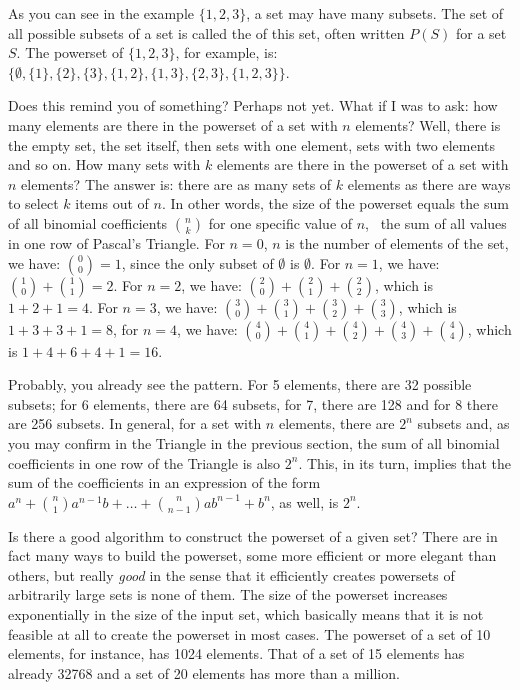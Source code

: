 \documentclass{scrreprt}
\begin{document}
As you can see in the example $\lbrace 1,2,3\rbrace$,
a set may have many subsets.
The set of all possible subsets of a set
is called the  of this set,
often written $P(S)$ for a set $S$.
The powerset of $\lbrace 1,2,3\rbrace$, for example, is:
$\lbrace
\emptyset,
\lbrace 1\rbrace,
\lbrace 2\rbrace,
\lbrace 3\rbrace,
\lbrace 1,2\rbrace,
\lbrace 1,3\rbrace,
\lbrace 2,3\rbrace,
\lbrace 1,2,3\rbrace\rbrace$.

Does this remind you of something?
Perhaps not yet.
What if I was to ask: 
how many elements are there 
in the powerset of a set with $n$ elements?
Well, there is the empty set,
the set itself,
then sets with one element,
sets with two elements
and so on.
How many sets with $k$ elements
are there in the powerset of a set with $n$ elements?
The answer is: 
there are as many sets of $k$ elements
as there are ways to select $k$ items out of $n$.
In other words, 
the size of the powerset equals 
the sum of all binomial coefficients 
$\binom{n}{k}$ for one specific value of $n$,
\ie\ the sum of all values 
in one row of Pascal's Triangle.
For $n=0$, $n$ is the number of elements of the set,
we have: $\binom{0}{0} = 1$,
since the only subset of $\emptyset$ is $\emptyset$.
For $n=1$, we have: $\binom{1}{0} + \binom{1}{1} = 2$.
For $n=2$, we have:
$\binom{2}{0} + \binom{2}{1} + \binom{2}{2}$,
which is $1 + 2 + 1 = 4$.
For $n=3$, we have:
$\binom{3}{0} + \binom{3}{1} + \binom{3}{2} + \binom{3}{3}$,
which is $1 + 3 + 3 + 1 = 8$,
for $n=4$, we have:
$\binom{4}{0} + \binom{4}{1} + \binom{4}{2} + \binom{4}{3} + \binom{4}{4}$,
which is $1 + 4 + 6 + 4 + 1 = 16$.

Probably, you already see  the pattern.
For 5 elements, there are 32 possible subsets;
for 6 elements, there are 64 subsets,
for 7, there are 128 and for 8 there are 256 subsets.
In general,
for a set with $n$ elements,
there are $2^n$ subsets and,
as you may confirm in the Triangle in the previous section,
the sum of all binomial coefficients in one row of the Triangle
is also $2^n$.
This, in its turn, implies that the sum
of the coefficients in an expression of the form 
$a^n + \binom{n}{1}a^{n-1}b + \dots + \binom{n}{n-1}ab^{n-1} + b^n$,
as well, is $2^n$.

Is there a good algorithm 
to construct the powerset of a given set?
There are in fact many ways to build the powerset,
some more efficient or more elegant than others,
but really \emph{good} in the sense
that it efficiently creates powersets
of arbitrarily large sets
is none of them.
The size of the powerset 
increases exponentially in the size
of the input set, which basically means
that it is not feasible at all to 
create the powerset in most cases.
The powerset of a set of 10 elements,
for instance, has \num{1024} elements.
That of a set of 15 elements
has already \num{32768}
and a set of 20 elements has more than a million.
\end{document}
